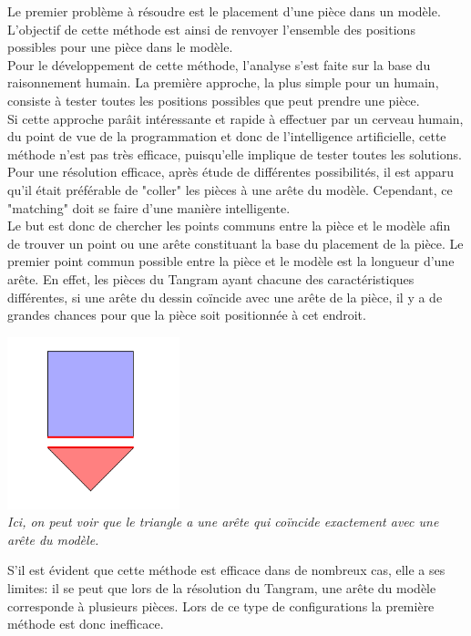 \documentclass[a4paper, 11pt]{report}
\begin{document}
		Le premier problème à résoudre est le placement d'une pièce dans un modèle. L'objectif de cette méthode est ainsi de renvoyer l'ensemble des positions possibles pour une pièce dans le modèle.\\
		Pour le développement de cette méthode, l'analyse s'est faite sur la base du raisonnement humain. La première approche, la plus simple pour un humain, consiste à tester toutes les positions possibles que peut prendre une pièce.\\
		Si cette approche par\^ait intéressante et rapide à effectuer par un cerveau humain, du point de vue de la programmation et donc de l'intelligence artificielle, cette méthode n'est pas très efficace, puisqu'elle implique de tester toutes les solutions.\\
		Pour une résolution efficace, après étude de différentes possibilités, il est apparu qu'il était préférable de "coller" les pièces à une arête du modèle. Cependant, ce "matching" doit se faire d'une manière intelligente. \\
		Le but est donc de chercher les points communs entre la pièce et le modèle afin de trouver un point ou une arête constituant la base du placement de la pièce. Le premier point commun possible entre la pièce et le modèle est la longueur d'une arête. En effet, les pièces du Tangram ayant chacune des caractéristiques différentes, si une arête du dessin coïncide avec une arête de la pièce, il y a de grandes chances pour que la pièce soit positionnée à cet endroit. 
    
    \begin{center}
    \includegraphics[width=5cm]{place_figure_exacte_match}\\
    \emph{Ici, on peut voir que le triangle a une arête qui coïncide exactement avec une arête du modèle.}\\
    \end{center}

    S'il est évident que cette méthode est efficace dans de nombreux cas, elle a ses limites: il se peut que lors de la résolution du Tangram, une arête du modèle corresponde à plusieurs pièces. Lors de ce type de configurations la première méthode est donc inefficace. 
\end{document}
